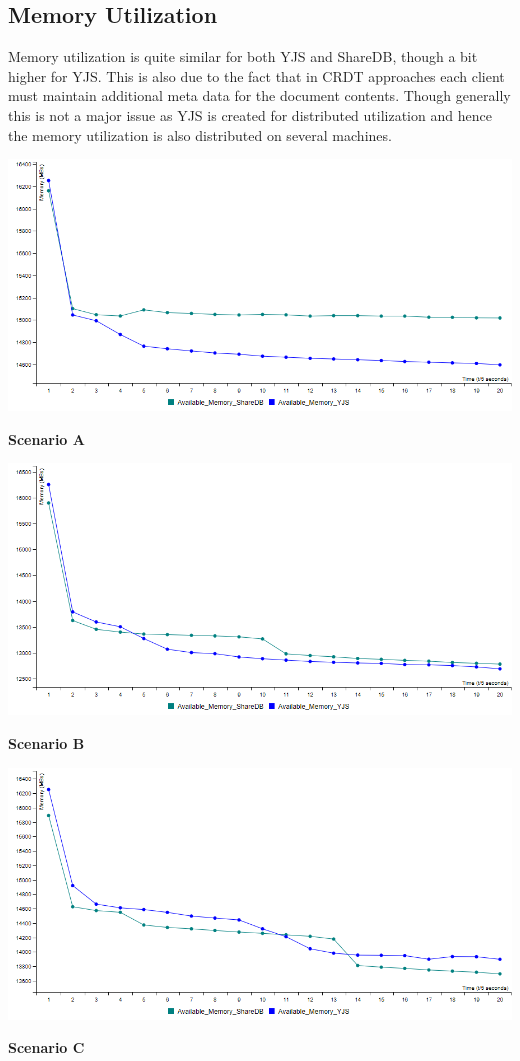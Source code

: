 \documentclass[9pt, titlepage]{article}
\begin{document}
  \subsection{Memory Utilization}
  Memory utilization is quite similar for both YJS and ShareDB, though a bit higher for YJS. This is also due to the fact that
  in CRDT approaches each client must maintain additional meta data for the document contents. Though generally this is not a 
  major issue as YJS is created for distributed utilization and hence the memory utilization is also distributed on several machines.
  \begin{center}
    \includegraphics[scale=0.48]{scenario_a/memory.png}

    \textbf{Scenario A}
    
    \includegraphics[scale=0.48]{scenario_b/memory.png}
    
    \textbf{Scenario B}
    
    \includegraphics[scale=0.48]{scenario_c/memory.png}
    
    \textbf{Scenario C}

  \end{center}
\end{document}
